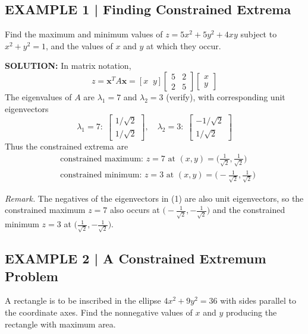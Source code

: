 \documentclass{article}
\begin{document}
\subsection*{EXAMPLE 1 | Finding Constrained Extrema}

Find the maximum and minimum values of $z=5x^2+5y^2+4xy$ subject to $x^2+y^2=1$,
and the values of $x$ and $y$ at which they occur.

\textbf{SOLUTION:} In matrix notation,
\[
  z = \mathbf{x}^T A\mathbf{x} = [x\;\;y]\begin{bmatrix}5&2\\2&5\end{bmatrix}
  \begin{bmatrix}x\\y\end{bmatrix}
\]
The eigenvalues of $A$ are $\lambda_1=7$ and $\lambda_2=3$ (verify), with corresponding
unit eigenvectors
\begin{equation}
  \lambda_1=7:\;\begin{bmatrix}1/\sqrt{2}\\1/\sqrt{2}\end{bmatrix},\quad
  \lambda_2=3:\;\begin{bmatrix}-1/\sqrt{2}\\1/\sqrt{2}\end{bmatrix} \tag{1}
\end{equation}
Thus the constrained extrema are
\begin{align*}
  &\text{constrained maximum: } z=7 \text{ at } (x,y)=\bigl(\tfrac{1}{\sqrt2},\tfrac{1}{\sqrt2}\bigr)\\
  &\text{constrained minimum: } z=3 \text{ at } (x,y)=\bigl(-\tfrac{1}{\sqrt2},\tfrac{1}{\sqrt2}\bigr)
\end{align*}

\textit{Remark.} The negatives of the eigenvectors in (1) are also unit eigenvectors, so the
constrained maximum $z=7$ also occurs at $\bigl(-\tfrac{1}{\sqrt2},-\tfrac{1}{\sqrt2}\bigr)$
and the constrained minimum $z=3$ at $\bigl(\tfrac{1}{\sqrt2},-\tfrac{1}{\sqrt2}\bigr)$.

\subsection*{EXAMPLE 2 | A Constrained Extremum Problem}

A rectangle is to be inscribed in the ellipse $4x^2+9y^2=36$ with sides parallel to the
coordinate axes. Find the nonneg\-ative values of $x$ and $y$ producing the rectangle with
maximum area.
\end{document}
